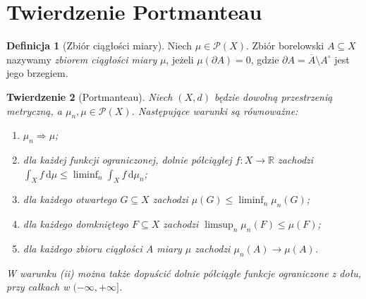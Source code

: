 \documentclass[11pt,a4paper,oneside]{book}
\numberwithin{equation}{chapter}
\theoremstyle{plain}
\newtheorem{twierdzenie}{Twierdzenie}[chapter]
\theoremstyle{definition}
\newtheorem{definicja}[twierdzenie]{Definicja}
\theoremstyle{remark}
\begin{document}
\section{Twierdzenie Portmanteau}
\begin{definicja}[Zbiór ciągłości miary]
\label{def:continuity-set-22}
Niech $\mu\in\mathcal P(X)$. Zbiór borelowski
$A\subseteq X$ nazywamy \emph{zbiorem ciągłości miary}
$\mu$, jeżeli $\mu(\partial A)=0$, gdzie
$\partial A=\overline A\setminus A^\circ$ jest jego brzegiem.
\end{definicja}

\begin{twierdzenie}[Portmanteau]
\label{thm:portmanteau-22}
Niech $(X,d)$ będzie dowolną przestrzenią metryczną,
a $\mu_n,\mu\in\mathcal P(X)$. Następujące warunki
są równoważne:
\begin{enumerate}[label=(\roman*)]
\item $\mu_n\Rightarrow\mu$;
\item dla każdej funkcji ograniczonej, dolnie półciągłej
$f:X\to\mathbb R$ zachodzi
$\int_Xf\,\mathrm d\mu\le\liminf_n\int_Xf\,\mathrm d\mu_n$;
\item dla każdego otwartego $G\subseteq X$ zachodzi
$\mu(G)\le\liminf_n\mu_n(G)$;
\item dla każdego domkniętego $F\subseteq X$ zachodzi
$\limsup_n\mu_n(F)\le\mu(F)$;
\item dla każdego zbioru ciągłości $A$ miary $\mu$
zachodzi $\mu_n(A)\to\mu(A)$.
\end{enumerate}
W warunku (ii) można także dopuścić dolnie półciągłe
funkcje ograniczone z dołu, przy całkach w $(-\infty,+\infty]$.
\end{twierdzenie}
\end{document}
